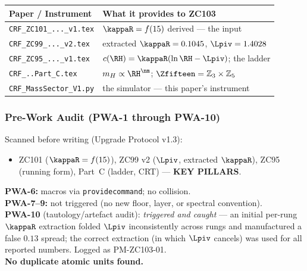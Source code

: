 \documentclass[12pt, a4paper]{article}
\begin{document}
\begin{keybox}[title={Companion Papers --- ZC103}]
{\small\renewcommand{\arraystretch}{1.25}
\begin{center}
\begin{tabular}{@{}p{5.0cm}p{7.5cm}@{}}
\toprule
\textbf{Paper / Instrument} & \textbf{What it provides to ZC103} \\
\midrule
\texttt{CRF\_ZC101\_...\_v1.tex}   & $\kappaR=f(15)$ derived --- the input \\
\texttt{CRF\_ZC99\_...\_v2.tex}    & extracted $\kappaR=0.1045$, $\Lpiv=1.4028$ \\
\texttt{CRF\_ZC95\_...\_v1.tex}    & $c(\RH)=\kappaR(\ln\RH-\Lpiv)$; the ladder \\
\texttt{CRF\_..Part\_C.tex}        & $m_H\propto\RH^{\nm}$; $\Zfifteen=\mathbb{Z}_3\times\mathbb{Z}_5$ \\
\texttt{CRF\_MassSector\_V1.py}    & the simulator --- this paper's instrument \\
\bottomrule
\end{tabular}
\end{center}}
\end{keybox}

\subsubsection{Pre-Work Audit (PWA-1 through PWA-10)}

\begin{formalbox}[title={Pre-Work Audit Record --- ZC103}]
Scanned before writing (Upgrade Protocol v1.3):
\begin{itemize}[leftmargin=2em, noitemsep]
  \item ZC101 ($\kappaR=f(15)$), ZC99 v2 ($\Lpiv$, extracted $\kappaR$),
    ZC95 (running form), Part~C (ladder, CRT) --- \textbf{KEY PILLARS}.
\end{itemize}
\textbf{PWA-6:} macros via \texttt{providecommand}; no collision.\\
\textbf{PWA-7--9:} not triggered (no new floor, layer, or spectral convention).\\
\textbf{PWA-10} (tautology/artefact audit): \emph{triggered and caught} --- an
initial per-rung $\kappaR$ extraction folded $\Lpiv$ inconsistently across rungs
and manufactured a false $0.13$ spread; the correct extraction (in which $\Lpiv$
cancels) was used for all reported numbers. Logged as PM-ZC103-01.\\
\textbf{No duplicate atomic units found.}
\end{formalbox}
\end{document}
